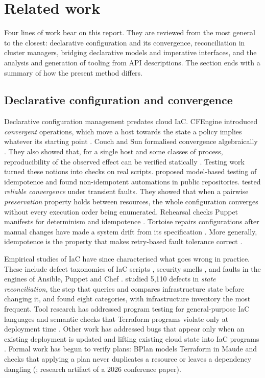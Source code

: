 \section{Related work}\label{sec:2}

Four lines of work bear on this report. They are reviewed from the most general to the closest:
declarative configuration and its convergence, reconciliation in cluster managers, bridging
declarative models and imperative interfaces, and the analysis and generation of tooling from API
descriptions. The section ends with a summary of how the present method differs.

\subsection{Declarative configuration and convergence}\label{sec:2.1}

Declarative configuration management predates cloud IaC. CFEngine introduced \emph{convergent} operations,
which move a host towards the state a policy implies whatever its starting point
\citep{burgess2005}. Couch and Sun formalised convergence
algebraically \citep{couch2003}. They also showed
that, for a single host and some classes of process, reproducibility of the observed effect can be
verified statically \citep{couch2004}. Testing work
turned these notions into checks on real scripts. \citet{hummer2013}
proposed model-based testing of idempotence and found non-idempotent automations in public
repositories. \citet{hanappi2016} tested \emph{reliable
convergence} under transient faults. They showed that when a pairwise \emph{preservation} property holds
between resources, the whole configuration converges without every execution order being enumerated.
Rehearsal checks Puppet manifests for determinism and idempotence
\citep{shambaugh2016}. Tortoise repairs configurations
after manual changes have made a system drift from its specification
\citep{weiss2017}. More generally, idempotence is the
property that makes retry-based fault tolerance correct
\citep{ramalingam2013}.

Empirical studies of IaC have since characterised what goes wrong in practice. These include defect
taxonomies of IaC scripts \citep{rahman2020}, security
smells \citep{rahman2019b}, and faults in the engines of
Ansible, Puppet and Chef \citep{drosos2024}.
\citet{hassan2024} studied 5,110 defects in \emph{state
reconciliation}, the step that queries and compares infrastructure state before changing it, and
found eight categories, with infrastructure inventory the most frequent. Tool research has addressed
program testing for general-purpose IaC languages
\citep{sokolowski2024} and semantic checks that
Terraform programs violate only at deployment time
\citep{qiu2024}. Other work has addressed bugs that
appear only when an existing deployment is updated
\citep{xiang2025} and lifting existing cloud state
into IaC programs \citep{peng2025}. Formal work has
begun to verify plans: BPlan models Terraform in Maude and checks that applying a plan never
duplicates a resource or leaves a dependency dangling
(\citealp{perdereau2026}; research artifact of a 2026
conference paper).

